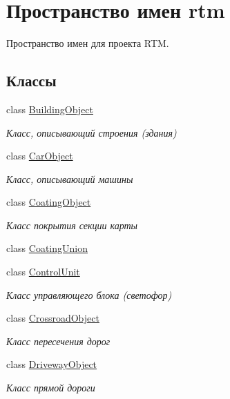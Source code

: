 \hypertarget{namespacertm}{}\section{Пространство имен rtm}
\label{namespacertm}


Пространство имен для проекта R\+TM.  


\subsection*{Классы}
\begin{DoxyCompactItemize}
\item 
class \hyperlink{classrtm_1_1_building_object}{Building\+Object}
\begin{DoxyCompactList}\small\item\em Класс, описывающий строения (здания) \end{DoxyCompactList}\item 
class \hyperlink{classrtm_1_1_car_object}{Car\+Object}
\begin{DoxyCompactList}\small\item\em Класс, описывающий машины \end{DoxyCompactList}\item 
class \hyperlink{classrtm_1_1_coating_object}{Coating\+Object}
\begin{DoxyCompactList}\small\item\em Класс покрытия секции карты \end{DoxyCompactList}\item 
class \hyperlink{classrtm_1_1_coating_union}{Coating\+Union}
\item 
class \hyperlink{classrtm_1_1_control_unit}{Control\+Unit}
\begin{DoxyCompactList}\small\item\em Класс управляющего блока (светофор) \end{DoxyCompactList}\item 
class \hyperlink{classrtm_1_1_crossroad_object}{Crossroad\+Object}
\begin{DoxyCompactList}\small\item\em Класс пересечения дорог \end{DoxyCompactList}\item 
class \hyperlink{classrtm_1_1_driveway_object}{Driveway\+Object}
\begin{DoxyCompactList}\small\item\em Класс прямой дороги \end{DoxyCompactList}\item 

\end{DoxyCompactItemize}
